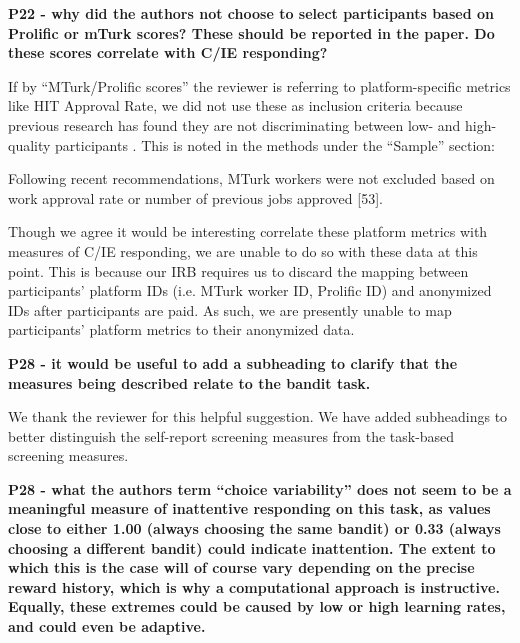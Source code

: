 \documentclass[a4paper,notitlepage,12pt]{article}
\begin{document}
\textbf{P22 - why did the authors not choose to select participants based on Prolific or mTurk scores? These should be reported in the paper. Do these scores correlate with C/IE responding?}

If by ``MTurk/Prolific scores'' the reviewer is referring to platform-specific metrics like HIT Approval Rate, we did not use these as inclusion criteria because previous research has found they are not discriminating between low- and high-quality participants \cite{robinson2019tapped}. This is noted in the methods under the ``Sample'' section:

\begin{displayquote}
Following recent recommendations, MTurk workers were not excluded based on work approval rate or number of previous jobs approved [53].
\end{displayquote}

Though we agree it would be interesting correlate these platform metrics with measures of C/IE responding, we are unable to do so with these data at this point. This is because our IRB requires us to discard the mapping between participants' platform IDs (i.e. MTurk worker ID, Prolific ID) and anonymized IDs after participants are paid. As such, we are presently unable to map participants' platform metrics to their anonymized data.

\textbf{P28 - it would be useful to add a subheading to clarify that the measures being described relate to the bandit task.}

We thank the reviewer for this helpful suggestion. We have added subheadings to better distinguish the self-report screening measures from the task-based screening measures. 

\textbf{P28 - what the authors term ``choice variability'' does not seem to be a meaningful measure of inattentive responding on this task, as values close to either 1.00 (always choosing the same bandit) or 0.33 (always choosing a different bandit) could indicate inattention. The extent to which this is the case will of course vary depending on the precise reward history, which is why a computational approach is instructive. Equally, these extremes could be caused by low or high learning rates, and could even be adaptive.}
\end{document}
